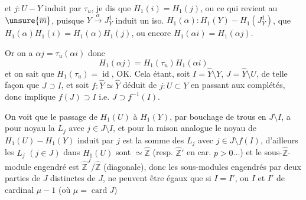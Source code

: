 et $j:U-Y$ induit par $\tau_u$, je dis que $H_1(i)=H_1(j)$, ou ce qui revient au $\unsure{\overline m}$, puisque $Y\xrightarrow{\alpha}J_Y^1$ induit un iso. $H_1(\alpha):H_1(Y)-H_1(J_Y^1)$, que $H_1(\alpha)H_1(i)=H_1(\alpha)H_1(j)$, ou encore $H_1(\alpha i)=H_1(\alpha j)$.

Or on a $\alpha j=\tau_u(\alpha i)$ donc 
\[
H_1(\alpha j)=H_1(\tau_u)H_1(\alpha i)
\]
et on sait que $H_1(\tau_u)=\operatorname{id}$, OK. Cela étant, soit $I=\widehat Y\setminus Y$, $J=\widehat Y\setminus U$, de telle façon que $J\supset I$, et soit $f:\widehat Y\simeq\widehat Y$ déduit de $j:U\subset Y$ en passant aux complétés, donc   implique $f(J)\supset I$ i.e. $J\supset f^{-1}(I)$.

On voit que le passage de $H_1(U)$ à $H_1(Y)$, par bouchage de trous en $J\setminus I$, a pour noyau la  $L_j$ avec $j\in J\setminus I$, et pour la raison analogue le noyau de $H_1(U)-H_1(Y)$ induit par $j$ est la somme des $L_j$ avec $j\in J\setminus f(I)$, d'ailleurs les $L_j$ $(j\in J)$ dans $H_1(U)$ sont $\simeq\widehat{\mathbb Z}$ (resp. $\widehat{\mathbb Z}'$ en car. $p>0$...) et le sous-$\widehat{\mathbb Z}$-module engendré est $\widehat{\mathbb Z}^{J}/\widehat{\mathbb Z}$ (diagonale), donc  les sous-modules engendrés par deux parties  de $J$ distinctes de $J$, ne peuvent être égaux que si $I=I'$, ou $I$ et $I'$ de cardinal $\mu-1$ (où $\mu=\operatorname{card}J$)
